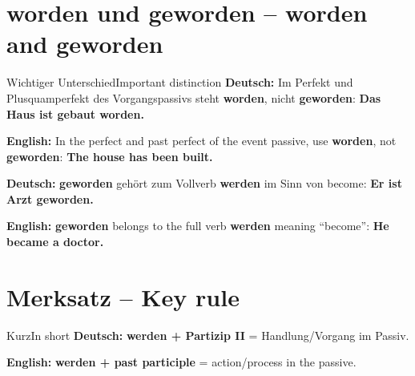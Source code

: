 \documentclass[a4paper,11pt]{article}
\newcommand{\GermanText}[1]{\textbf{Deutsch: }#1\par}
\newcommand{\EnglishText}[1]{{\small\color{SoftGray}\textbf{English: }#1\par}}
\begin{document}
\section{worden und geworden -- worden and geworden}
\begin{grammarentry}{Wichtiger Unterschied}{Important distinction}
\GermanText{Im Perfekt und Plusquamperfekt des Vorgangspassivs steht \textbf{worden}, nicht \textbf{geworden}: \textbf{Das Haus ist gebaut worden.}}
\EnglishText{In the perfect and past perfect of the event passive, use \textbf{worden}, not \textbf{geworden}: \textbf{The house has been built.}}
\GermanText{\textbf{geworden} gehört zum Vollverb \textbf{werden} im Sinn von \glqq become\grqq: \textbf{Er ist Arzt geworden.}}
\EnglishText{\textbf{geworden} belongs to the full verb \textbf{werden} meaning ``become'': \textbf{He became a doctor.}}
\end{grammarentry}

\section{Merksatz -- Key rule}
\begin{grammarentry}{Kurz}{In short}
\GermanText{\textbf{werden + Partizip II} = Handlung/Vorgang im Passiv.}
\EnglishText{\textbf{werden + past participle} = action/process in the passive.}
\end{grammarentry}
\end{document}

